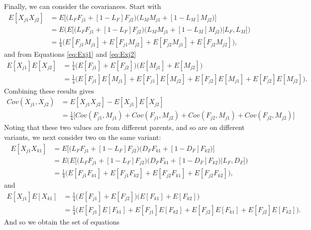 \documentclass{article}
\begin{document}
Finally, we can consider the covariances. Start with
\begin{align*}
  E[X_{j1} X_{j2}] & = E \Big [ \big ( L_F F_{j1} + [1 - L_F] F_{j2} \big ) \big ( L_M M_{j1} + [1 - L_M] M_{j2} \big ) \Big ] \\
                    & = E \Bigg ( E \Big [ \big ( L_F F_{j1} + [1 - L_F] F_{j2} \big ) \big ( L_M M_{j1} + [1 - L_M] M_{j2} \big ) \Big | L_F, L_M \Big ] \Bigg )\\
  & = \frac{1}{4} \Big ( E[F_{j1} M_{j1}] + E[F_{j1} M_{j2}] + E[F_{j2} M_{j1}] + E[F_{j2} M_{j2}] \Big ),
\end{align*}
and from Equations \ref{eq:Exj1} and \ref{eq:Exj2}
\begin{align*}
  E[X_{j1}] E[X_{j2}] & = \frac{1}{4} \Big ( E[F_{j1}] + E[F_{j2}] \Big ) \Big ( E[M_{j1}] + E[M_{j2}] \Big ) \\
  & = \frac{1}{4} \Big ( E[F_{j1}] E[M_{j1}] + E[F_{j1}] E[M_{j2}] + E[F_{j2}] E[M_{j1}] + E[F_{j2}] E[M_{j2}] \Big ).
\end{align*}
Combining these results gives
\begin{align*}
  Cov(X_{j1}, X_{j2}) & = E[X_{j1} X_{j2}] - E[X_{j1}] E[X_{j2}] \\
                      & = \frac{1}{4} \Big [ Cov(F_{j1}, M_{j1}) + Cov(F_{j1}, M_{j2}) + Cov(F_{j2}, M_{j1}) + Cov(F_{j2}, M_{j2}) \Big ]
\end{align*}
Noting that these two values are from different parents, and so are on different variants, we next consider two on the same variant:
\begin{align*}
  E[X_{j1} X_{k1}] & = E \Big [ \big ( L_F F_{j1} + [1 - L_F] F_{j2} \big ) \big ( D_F F_{k1} + [1 - D_F] F_{k2} \big ) \Big ] \\
                    & = E \Bigg ( E \Big [ \big ( L_F F_{j1} + [1 - L_F] F_{j2} \big ) \big ( D_F F_{k1} + [1 - D_F] F_{k2} \big ) \Big | L_F, D_F \Big ] \Bigg )\\
  & = \frac{1}{4} \Big ( E[F_{j1} F_{k1}] + E[F_{j1} F_{k2}] + E[F_{j2} F_{k1}] + E[F_{j2} F_{k2}] \Big ),
\end{align*}
and
\begin{align*}
  E[X_{j1}] E[X_{k1}] & = \frac{1}{4} \Big ( E[F_{j1}] + E[F_{j2}] \Big ) \Big ( E[F_{k1}] + E[F_{k2}] \Big ) \\
  & = \frac{1}{4} \Big ( E[F_{j1}] E[F_{k1}] + E[F_{j1}] E[F_{k2}] + E[F_{j2}] E[F_{k1}] + E[F_{j2}] E[F_{k2}] \Big ).
\end{align*}
And so we obtain the set of equations
\end{document}
